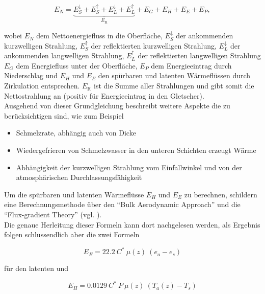 \documentclass[12pt,a4paper]{article}
\begin{document}
\begin{equation}
E_{N}=\underbrace{E_{S}^{\downarrow}+E_{S}^{\uparrow}+E_{L}^{\downarrow}+E_{L}^{\uparrow}}_{E_{\mathrm{R}}}+E_{G}+E_{H}+E_{E}+E_{P},
\end{equation}

wobei $E_{N}$ dem Nettoenergiefluss in die Oberfläche, $E_{S}^{\downarrow}$ der ankommenden kurzwelligen Strahlung, $E_{S}^{\uparrow}$ der reflektierten kurzwelligen Strahlung, $E_{L}^{\downarrow}$ der ankommenden langwelligen Strahlung, $E_{L}^{\uparrow}$ der reflektierten langwelligen Strahlung $E_{G}$ dem Energiefluss unter der Oberfläche, $E_{P}$ dem Energieeintrag durch Niederschlag und $E_{H}$ und $E_{E}$ den spürbaren und latenten Wärmeflüssen durch Zirkulation entsprechen. $E_{\mathrm{R}}$ ist die Summe aller Strahlungen und gibt somit die Nettostrahlung an (positiv für Energieeintrag in den Gletscher).\\

Ausgehend von dieser Grundgleichung beschreibt \citeauthor{ThePhysicsOfGlaciers} weitere Aspekte die zu berücksichtigen sind, wie zum Beispiel 

\begin{itemize}
\item{Schmelzrate, abhängig auch von Dicke }
\item{Wiedergefrieren von Schmelzwasser in den unteren Schichten erzeugt Wärme}
\item{Abhängigkeit der kurzwelligen Strahlung vom Einfallwinkel und von der atmosphärischen Durchlassungsfähigkeit}
\end{itemize}

Um die spürbaren und latenten Wärmeflüsse $E_{H}$ und $E_{E}$ zu berechnen, schildern \citeauthor{ThePhysicsOfGlaciers} eine Berechnungsmethode über den ``Bulk Aerodynamic Approach'' und die ``Flux-gradient Theory'' (vgl. \cite[153-157]{ThePhysicsOfGlaciers}).\\
Die genaue Herleitung dieser Formeln kann dort nachgelesen werden, als Ergebnis folgen schlussendlich aber die zwei Formeln

\begin{equation}\label{Berechnung latenter Energiefluss}
E_{E}= 22.2~C^*~\mu(z)~(e_a-e_s)
\end{equation}

für den latenten und

\begin{equation}\label{Berechnung sensibler Energiefluss}
E_{H}= 0.0129~C^*~P~\mu(z)~(T_a(z)-T_s)
\end{equation}
\end{document}
